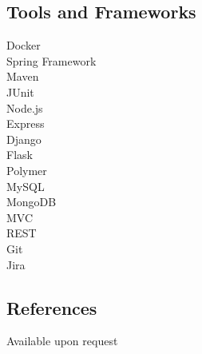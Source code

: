 \documentclass[letterpaper]{deedy-resume}
\begin{document}
\begin{minipage}[t]{0.21\textwidth}
\subsection{Tools and Frameworks}
Docker \\ 
Spring Framework \\ 
Maven \\ 
JUnit \\
Node.js \\ 
Express \\ 
Django \\ 
Flask \\ 
Polymer \\ 
MySQL \\ 
MongoDB \\ 
MVC \\ 
REST \\ 
Git \\ 
Jira  
 \sectionspace

\subsection{References}
Available upon request




\end{minipage} 
\end{document}
